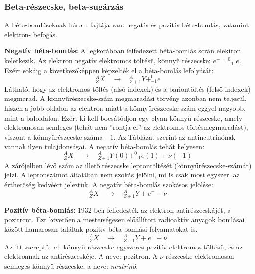 \documentclass[../main.tex]{subfiles}
\begin{document}
\subsubsection{Beta-részecske, beta-sugárzás}
A béta-bomlásoknak három fajtája van: negatív és pozitív béta-bomlás, valamint elektron-
befogás.

\textbf{Negatív béta-bomlás:} A legkorábban felfedezett béta-bomlás során elektron keletkezik. Az elektron negatív elektromos töltésű, könnyű részecske: $e^- = ^0_{-1} e$. Ezért sokáig a következőképpen
képzelték el a béta-bomlás lefolyását:
\begin{equation}
    ^A_Z X \quad \rightarrow \quad ^A_{Z+1} Y + ^0_{-1} e
\end{equation}
Látható, hogy az elektromos töltés (alsó indexek) és a bariontöltés (felső indexek) megmarad. A könnyűrészecske-szám megmaradási törvény azonban nem teljesül, hiszen a
jobb oldalon az elektron miatt a könnyűrészecske-szám eggyel nagyobb, mint a baloldalon. Ezért ki kell bocsátódjon egy olyan könnyű részecske, amely
elektromosan semleges (tehát nem ”rontja el” az elektromos töltésmegmaradást), viszont
a könnyűrészecske száma $-1$. Az Táblázat szerint az antineutrínónak vannak ilyen
tulajdonságai. A negatív béta-bomlás tehát helyesen:
\begin{equation}
    ^A_Z X \quad \rightarrow \quad ^A_{Z+1} Y(0) + ^0_{-1} e(1) + \tilde{\nu} (-1)
\end{equation}
A zárójelben lévő szám az illető részecske leptontöltését (könnyűrészecske-számát) jelzi.
A leptonszámot általában nem szokás jelölni, mi is csak most egyszer, az érthetőség
kedvéért jeleztük. A negatív béta-bomlás szokásos jelölése:
\begin{equation}
    ^A_Z X \quad \rightarrow \quad ^A_{Z+1} Y + e^- + \tilde{\nu}
\end{equation}

\textbf{Pozitív béta-bomlás:} 1932-ben felfedezték az elektron antirészecskájét, a pozitront.
Ezt követően a mesterségesen előállított radioaktív anyagok bomlásai között hamarosan találtak pozitív béta-bomlási folyamatokat is. 
\begin{equation}
    ^A_Z X \quad \rightarrow \quad ^A_{Z-1} Y + e^+ + \nu
\end{equation}
Az itt szerepl˝o $e^+$ könnyű részecske egyszeres pozitív elektromos töltésű, és az elektronnak az antirészecskéje. A neve: pozitron. A $\nu$ részecske elektromosan semleges
könnyű részecske, a neve: \textit{neutrínó}.
\end{document}
